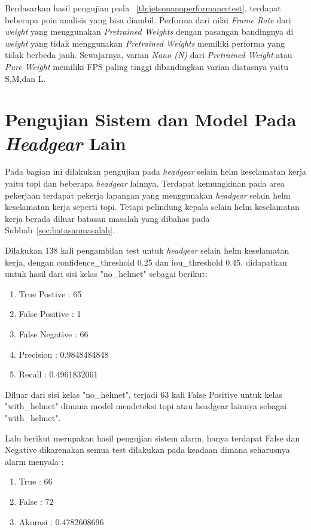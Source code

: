 \par Berdasarkan hasil pengujian pada ~\ref{tb:jetsonanoperformancetest}, terdapat beberapa poin analisis yang bisa diambil.
Performa dari nilai \emph{Frame Rate} dari \emph{weight} yang menggunakan \emph{Pretrained Weights} dengan pasangan bandingnya di \emph{weight}
yang tidak menggunakan \emph{Pretrained Weights} memiliki performa yang tidak berbeda jauh. Sewajarnya, varian \emph{Nano (N)} dari
\emph{Pretrained Weight} atau \emph{Pure Weight} memiliki FPS paling tinggi dibandingkan varian diatasnya yaitu S,M,dan L.

\section{Pengujian Sistem dan Model Pada \emph{Headgear} Lain}
\label{sec:otherheadgear_test}

\par Pada bagian ini dilakukan pengujian pada \emph{headgear} selain helm keselamatan kerja yaitu topi dan beberapa \emph{headgear} lainnya. Terdapat kemungkinan pada area pekerjaan terdapat pekerja lapangan yang menggunakan \emph{headgear} selain helm keselamatan kerja seperti topi. Tetapi pelindung kepala selain helm keselamatan kerja berada diluar batasan masalah yang dibahas pada Subbab~\ref{sec:batasanmasalah}.

Dilakukan 138 kali pengambilan test untuk \emph{headgear} selain helm keselamatan kerja, dengan confidence\_threshold 0.25 dan iou\_threshold 0.45, didapatkan untuk hasil dari sisi kelas "no\_helmet" sebagai berikut:

\begin{enumerate}[nolistsep]
  \item True Postive : 65
  \item False Positive : 1
  \item False Negative : 66
  \item Precision : 0.9848484848
  \item Recall : 0.4961832061
\end{enumerate}

Diluar dari sisi kelas "no\_helmet", terjadi 63 kali False Positive untuk kelas "with\_helmet" dimana model mendeteksi topi atau headgear lainnya sebagai "with\_helmet".

Lalu berikut merupakan hasil pengujian sistem alarm, hanya terdapat False dan Negative dikarenakan semua test dilakukan pada keadaan dimana seharusnya alarm menyala :

\begin{enumerate}[nolistsep]
  \item True : 66
  \item False : 72
  \item Akurasi : 0.4782608696
\end{enumerate}

